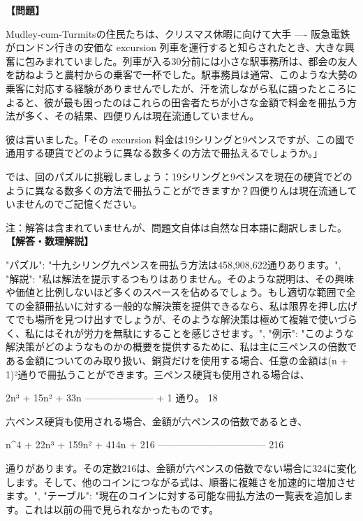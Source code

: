 \documentclass[10pt,a4paper,oneside,openany]{ltjsbook}
\begin{document}
\begin{tcolorbox}[colback=softblue,colframe=primaryblue,title=\textbf{第 32 問：THE EXCURSION TICKET PUZZLE.},arc=2mm,boxrule=1pt,breakable]
\textbf{【問題】}\par\vspace{0.3em}

 Mudley-cum-Turmitsの住民たちは、クリスマス休暇に向けて大手 ---- 阪急電鉄がロンドン行きの安価な excursion 列車を運行すると知らされたとき、大きな興奮に包みまれていました。列車が入る30分前には小さな駅事務所は、都会の友人を訪ねようと農村からの乗客で一杯でした。駅事務員は通常、このような大勢の乗客に対応する経験がありませんでしたが、汗を流しながら私に語ったところによると、彼が最も困ったのはこれらの田舎者たちが小さな金額で料金を冊払う方法が多く、その結果、四便りんは現在流通していません。

彼は言いました。「その excursion 料金は19シリングと9ペンスですが、この國で通用する硬貨でどのように異なる数多くの方法で冊払えるでしょうか。」

では、回のパズルに挑戦しましょう：19シリングと9ペンスを現在の硬貨でどのように異なる数多くの方法で冊払うことができますか？四便りんは現在流通していませんのでご記憶ください。

注：解答は含まれていませんが、問題文自体は自然な日本語に翻訳しました。
\tcblower
\textbf{【解答・数理解説】}\par\vspace{0.3em}
{
  "パズル": "十九シリング九ペンスを冊払う方法は458,908,622通りあります。",
  "解説": "私は解法を提示するつもりはありません。そのような説明は、その興味や価値と比例しないほど多くのスペースを佔めるでしょう。もし適切な範囲で全ての金額冊払いに対する一般的な解決策を提供できるなら、私は限界を押し広げてでも場所を見つけ出すでしょうが、そのような解決策は極めて複雑で使いづらく、私にはそれが労力を無駄にすることを感じさせます。",
  "例示": "このような解決策がどのようなものかの概要を提供するために、私は主に三ペンスの倍数である金額についてのみ取り扱い、銅貨だけを使用する場合、任意の金額は(n + 1)²通りで冊払うことができます。三ペンス硬貨も使用される場合は、

              2n³ + 15n² + 33n
            --------------------- + 1 通り。
                    18

六ペンス硬貨も使用される場合、金額が六ペンスの倍数であるとき、

          n\textasciicircum{}{4} + 22n³ + 159n² + 414n + 216
          ---------------------------------
                        216

通りがあります。その定数216は、金額が六ペンスの倍数でない場合に324に変化します。そして、他のコインにつながる式は、順番に複雑さを加速的に増加させます。",
  "テーブル": "現在のコインに対する可能な冊払方法の一覧表を追加します。これは以前の冊で見られなかったものです。

}
\end{tcolorbox}
\end{document}
